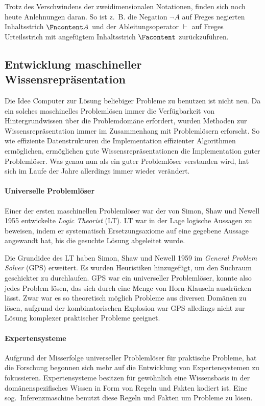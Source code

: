Trotz des Verschwindens der zweidimensionalen Notationen, finden sich noch heute Anlehnungen daran.
So ist z.~B. die Negation $\lnot A$ auf Freges negierten Inhaltsstrich $\Fncontent A$ und der Ableitungsoperator $\vdash$ auf Freges Urteilsstrich mit angefügtem Inhaltsstrich $\Facontent$ zurückzuführen.

\subsection{Entwicklung maschineller Wissensrepräsentation}
\label{sec:related:kr:history}

Die Idee Computer zur Lösung beliebiger Probleme zu benutzen ist nicht neu.
Da ein solches maschinelles Problemlösen immer die Verfügbarkeit von Hintergrundwissen über die Problemdomäne erfordert,
wurden Methoden zur Wissensrepräsentation immer im Zusammenhang mit Problemlösern erforscht.
So wie effiziente Datenstrukturen die Implementation effizienter Algorithmen ermöglichen, ermöglichen gute Wissensrepräsentationen die Implementation guter Problemlöser.
Was genau nun als ein guter Problemlöser verstanden wird, hat sich im Laufe der Jahre allerdings immer wieder verändert.

\paragraph{Universelle Problemlöser}
Einer der ersten maschinellen Problemlöser war der von Simon, Shaw und Newell 1955 entwickelte \textit{Logic Theorist} (LT).
LT war in der Lage logische Aussagen zu beweisen, indem er systematisch Ersetzungsaxiome auf eine gegebene Aussage angewandt hat, bis die gesuchte Lösung abgeleitet wurde.

Die Grundidee des LT haben Simon, Shaw und Newell 1959 im \textit{General Problem Solver} (GPS) erweitert.
Es wurden Heuristiken hinzugefügt, um den Suchraum geschickter zu durchlaufen.
GPS war ein universeller Problemlöser, konnte also jedes Problem lösen, das sich durch eine Menge von Horn-Klauseln ausdrücken lässt.
Zwar war es so theoretisch möglich Probleme aus diversen Domänen zu lösen, aufgrund der kombinatorischen Explosion war GPS alledings nicht zur Lösung komplexer praktischer Probleme geeignet.

\paragraph{Expertensysteme}
Aufgrund der Misserfolge universeller Problemlöser für praktische Probleme, hat die Forschung begonnen sich mehr auf die Entwicklung von Expertensystemen zu fokussieren.
Expertensysteme besitzen für gewöhnlich eine Wissensbasis in der domänenspezifisches Wissen in Form von Regeln und Fakten kodiert ist.
Eine sog.~Inferenzmaschine benutzt diese Regeln und Fakten um Probleme zu lösen.

